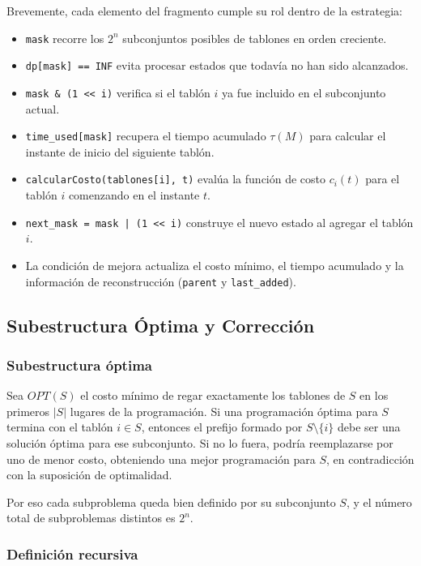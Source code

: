 \documentclass[12pt,a4paper]{article}
\newcommand{\cost}[1]{c_{#1}}
\begin{document}
Brevemente, cada elemento del fragmento cumple su rol dentro de la estrategia:
\begin{itemize}
  \item \texttt{mask} recorre los \(2^n\) subconjuntos posibles de tablones en orden creciente.
  \item \texttt{dp[mask] == INF} evita procesar estados que todav\'ia no han sido alcanzados.
  \item \verb|mask & (1 << i)| verifica si el tabl\'on \(i\) ya fue incluido en el subconjunto actual.
  \item \texttt{time\_used[mask]} recupera el tiempo acumulado \(\tau(M)\) para calcular el instante de inicio del siguiente tabl\'on.
  \item \texttt{calcularCosto(tablones[i], t)} eval\'ua la funci\'on de costo \(\cost{i}(t)\) para el tabl\'on \(i\) comenzando en el instante \(t\).
  \item \verb!next_mask = mask | (1 << i)! construye el nuevo estado al agregar el tabl\'on \(i\).
  \item La condici\'on de mejora actualiza el costo m\'inimo, el tiempo acumulado y la informaci\'on de reconstrucci\'on (\texttt{parent} y \texttt{last\_added}).
\end{itemize}

\subsection{Subestructura \'Optima y Correcci\'on}

\subsubsection{Subestructura \'optima}

Sea \(OPT(S)\) el costo m\'inimo de regar exactamente los tablones de \(S\) en los primeros \(|S|\) lugares de la programaci\'on. Si una programaci\'on \'optima para \(S\) termina con el tabl\'on \(i \in S\), entonces el prefijo formado por \(S \setminus \{i\}\) debe ser una soluci\'on \'optima para ese subconjunto. Si no lo fuera, podr\'ia reemplazarse por uno de menor costo, obteniendo una mejor programaci\'on para \(S\), en contradicci\'on con la suposici\'on de optimalidad.

Por eso cada subproblema queda bien definido por su subconjunto \(S\), y el n\'umero total de subproblemas distintos es \(2^n\).

\subsubsection{Definici\'on recursiva}
\end{document}
